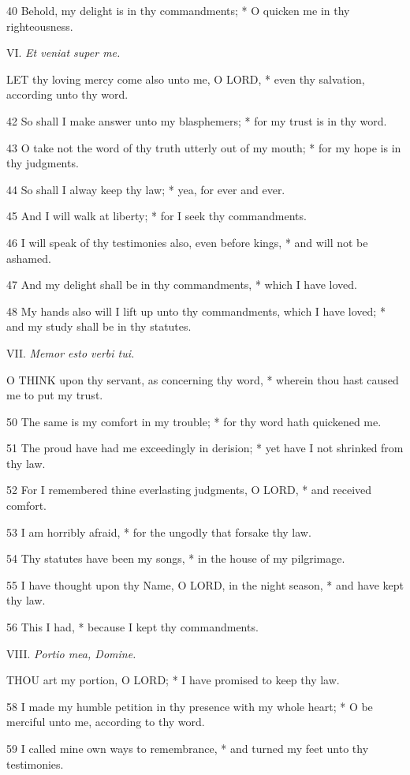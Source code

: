 40 Behold, my delight is in thy commandments; * O quicken
me in thy righteousness.

VI.
\emph{Et veniat super me.}

LET
thy loving mercy come also unto me, O LORD, * even thy salvation, according
unto thy word.

42 So shall I make answer unto my blasphemers; * for
my trust is in thy word.

43 O take not the word of thy truth utterly out of
my mouth; * for my hope is in thy judgments.

44 So shall I alway keep thy law; * yea, for ever and
ever.

45 And I will walk at liberty; * for I seek thy commandments.

46 I will speak of thy testimonies also, even before
kings, * and will not be ashamed.

47 And my delight shall be in thy commandments, * which
I have loved.

48 My hands also will I lift up unto thy commandments,
which I have loved; * and my study shall be in thy statutes.

VII.
\emph{Memor esto verbi tui.}

O
THINK upon thy servant, as concerning thy word, * wherein thou hast caused
me to put my trust.

50 The same is my comfort in my trouble; * for thy
word hath quickened me.

51 The proud have had me exceedingly in derision; *
yet have I not shrinked from thy law.

52 For I remembered thine everlasting judgments, O
LORD, * and received comfort.

53 I am horribly afraid, * for the ungodly that forsake
thy law.

54 Thy statutes have been my songs, * in the house
of my pilgrimage.

55 I have thought upon thy Name, O LORD, in the night
season, * and have kept thy law.

56 This I had, * because I kept thy commandments.

VIII.
\emph{Portio mea, Domine.}

THOU
art my portion, O LORD; * I have promised to keep thy law.

58 I made my humble petition in thy presence with my
whole heart; * O be merciful unto me, according to thy word.

59 I called mine own ways to remembrance, * and turned
my feet unto thy testimonies.

